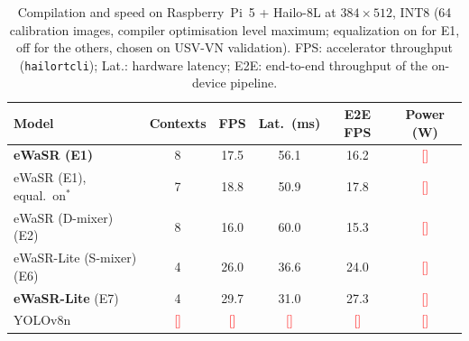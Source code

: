 \documentclass[conference]{IEEEtran}
\newcommand{\tbd}[1]{\textcolor{red}{[#1]}}
\begin{document}
\begin{table}[t]
\centering
\caption{Compilation and speed on Raspberry~Pi~5 + Hailo-8L at $384\times512$, INT8 (64 calibration images, compiler optimisation level maximum; equalization on for E1, off for the others, chosen on USV-VN validation). FPS: accelerator throughput (\texttt{hailortcli}); Lat.: hardware latency; E2E: end-to-end throughput of the on-device pipeline.}
\label{tab:hw}
\setlength{\tabcolsep}{2.5pt}
\begin{tabular}{lccccc}
\toprule
Model & Contexts & FPS & Lat.\ (ms) & E2E FPS & Power (W) \\
\midrule
\textbf{eWaSR (E1)}        & 8      & 17.5   & 56.1   & 16.2   & \tbd{} \\
eWaSR (E1), equal.\ on$^\ast$ & 7 & 18.8 & 50.9 & 17.8 & \tbd{} \\
eWaSR (D-mixer) (E2)      & 8      & 16.0   & 60.0   & 15.3   & \tbd{} \\
eWaSR-Lite (S-mixer) (E6) & 4      & 26.0   & 36.6   & 24.0   & \tbd{} \\
\textbf{eWaSR-Lite} (E7)  & 4      & 29.7   & 31.0   & 27.3   & \tbd{} \\
YOLOv8n                   & \tbd{} & \tbd{} & \tbd{} & \tbd{} & \tbd{} \\
\bottomrule
\end{tabular}
\end{table}
\end{document}
